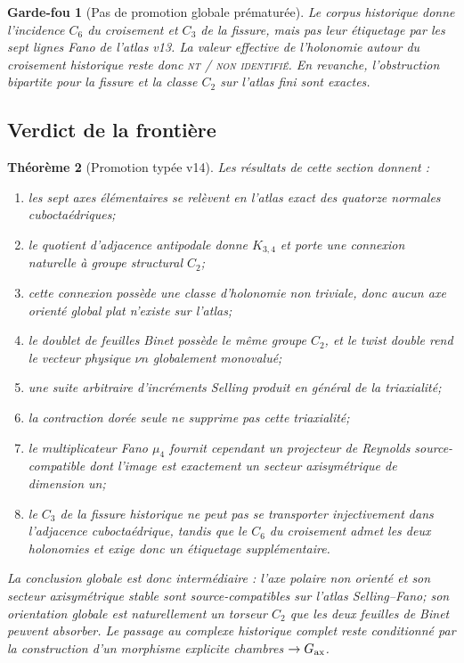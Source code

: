 \documentclass[11pt,a4paper]{article}
\newtheorem{theorem}{Théorème}[section]
\newtheorem{guardrail}[theorem]{Garde-fou}
\newcommand{\statusNT}{\textsc{nt / non identifié}}
\begin{document}
\begin{guardrail}[Pas de promotion globale prématurée]
Le corpus historique donne l'incidence $C_6$ du croisement et $C_3$ de la fissure, mais pas leur étiquetage par les sept lignes Fano de l'atlas v13. La valeur effective de l'holonomie autour du croisement historique reste donc \statusNT{}. En revanche, l'obstruction bipartite pour la fissure et la classe $C_2$ sur l'atlas fini sont exactes.
\end{guardrail}

\subsection{Verdict de la frontière}

\begin{theorem}[Promotion typée v14]\label{thm:v14-verdict}
Les résultats de cette section donnent :
\begin{enumerate}[label=\textup{(\roman*)}]
\item les sept axes élémentaires se relèvent en l'atlas exact des quatorze normales cuboctaédriques;
\item le quotient d'adjacence antipodale donne $K_{3,4}$ et porte une connexion naturelle à groupe structural $C_2$;
\item cette connexion possède une classe d'holonomie non triviale, donc aucun axe \emph{orienté} global plat n'existe sur l'atlas;
\item le doublet de feuilles Binet possède le même groupe $C_2$, et le twist double rend le vecteur physique $\nu n$ globalement monovalué;
\item une suite arbitraire d'incréments Selling produit en général de la triaxialité;
\item la contraction dorée seule ne supprime pas cette triaxialité;
\item le multiplicateur Fano $\mu_4$ fournit cependant un projecteur de Reynolds source-compatible dont l'image est exactement un secteur axisymétrique de dimension un;
\item le $C_3$ de la fissure historique ne peut pas se transporter injectivement dans l'adjacence cuboctaédrique, tandis que le $C_6$ du croisement admet les deux holonomies et exige donc un étiquetage supplémentaire.
\end{enumerate}
La conclusion globale est donc intermédiaire : l'axe polaire \emph{non orienté} et son secteur axisymétrique stable sont source-compatibles sur l'atlas Selling--Fano; son orientation globale est naturellement un torseur $C_2$ que les deux feuilles de Binet peuvent absorber. Le passage au complexe historique complet reste conditionné par la construction d'un morphisme explicite chambres $\to G_{\rm ax}$.
\end{theorem}
\end{document}
